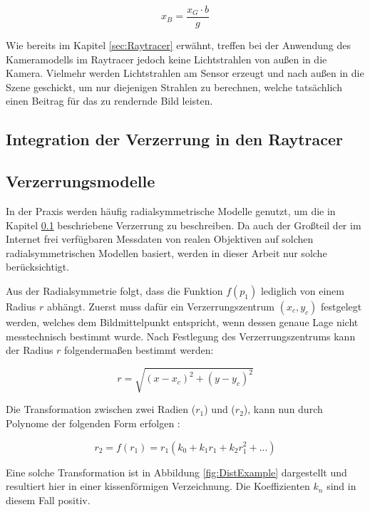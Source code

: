 \begin{equation}
x_B = \frac{x_G \cdot b}{g}
\end{equation}

Wie bereits im Kapitel \ref{sec:Raytracer} erwähnt, treffen bei der Anwendung des Kameramodells im Raytracer jedoch keine Lichtstrahlen von außen in die Kamera. Vielmehr werden Lichtstrahlen am Sensor erzeugt und nach außen in die Szene geschickt, um nur diejenigen Strahlen zu berechnen, welche tatsächlich einen Beitrag für das zu rendernde Bild leisten.

\subsection{Integration der Verzerrung in den Raytracer}\label{sec:DistortionRaytracer}



\subsection{Verzerrungsmodelle}
\label{subsec:verzerrungsmodelle}

In der Praxis werden häufig radialsymmetrische Modelle genutzt, um die in Kapitel \ref{sec:DistortionRaytracer} beschriebene Verzerrung zu beschreiben. Da auch der Großteil der im Internet frei verfügbaren Messdaten von realen Objektiven auf solchen radialsymmetrischen Modellen basiert, werden in dieser Arbeit nur solche berücksichtigt.

Aus der Radialsymmetrie folgt, dass die Funktion $f(p_1)$ lediglich von einem Radius $r$ abhängt. Zuerst muss dafür ein Verzerrungszentrum $(x_c, y_c)$ festgelegt werden, welches dem Bildmittelpunkt entspricht, wenn dessen genaue Lage nicht messtechnisch bestimmt wurde. Nach Festlegung des Verzerrungszentrums kann der Radius $r$ folgendermaßen bestimmt werden:

\begin{equation}
r = \sqrt{(x- x_c)^2 + (y-y_c)^2}
\end{equation}

Die Transformation zwischen zwei Radien ($r_1$) und ($r_2$), kann nun durch Polynome der folgenden Form erfolgen \cite{TangDistortionModels}:

\begin{equation}
r_2 = f(r_1) = r_1 (k_0 + k_1r_1 + k_2r_1^2 + ...)
\label{eq:PolyRadial}
\end{equation}

Eine solche Transformation ist in Abbildung \ref{fig:DistExample} dargestellt und resultiert hier in einer kissenförmigen Verzeichnung. Die Koeffizienten $k_n$ sind in diesem Fall positiv.

